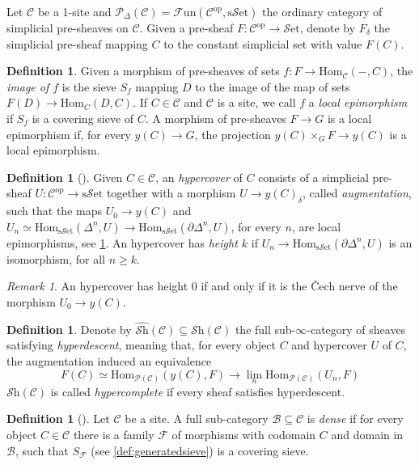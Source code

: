 \documentclass[a4paper]{book}
\newcommand{\lB}{\mathcal{B}}
\newcommand{\lC}{\mathcal{C}}
\newcommand{\lF}{\mathcal{F}}
\newcommand{\lP}{\mathcal{P}}
\newcommand{\lS}{\mathcal{S}}
\newcommand{\op}{\mathrm{op}}
\newcommand{\set}{\lS\mathrm{et}} %
\newcommand{\Fun}{\lF\mathrm{un}} %
\newcommand{\Shv}{\lS\mathrm{h}} %
\newcommand{\sset}{\mathrm{s}\set} %
\renewcommand{\hom}{\mathrm{Hom}} %
\theoremstyle{definition}
\newtheorem{definition}[equation]{Definition}
\theoremstyle{remark}
\newtheorem{remark}[equation]{Remark}
\numberwithin{equation}{section}
\begin{document}
Let $\lC$ be a 1-site and $\lP_\Delta(\lC)=\Fun(\lC^{\op},\sset)$ the ordinary category of simplicial pre-sheaves on $\lC$. Given a pre-sheaf $F:\lC^{\op}\to\set$, denote by $F_\delta$ the simplicial pre-sheaf mapping $C$ to the constant simplicial set with value $F(C)$. 
\begin{definition}\label{def:locepi}
	Given a morphism of pre-sheaves of sets $f:F\to\hom_\lC(-,C)$, the \emph{image of $f$} is the sieve $S_f$  mapping $D$ to the image of the map of sets $F(D)\to\hom_C(D,C)$. If $C\in\lC$ and $\lC$ is a site, we call $f$ a \emph{local epimorphism} if $S_f$ is a covering sieve of $C$. A morphism of pre-sheaves $F\to G$ is a local epimorphism if, for every $y(C)\to G$, the projection $y(C)\times_GF\to y(C)$ is a local epimorphism. 
\end{definition}
\begin{definition}[{\cite[Lemma 4.9]{dugger2003hypercoverssimplicialpresheaves}}]
	Given $C\in\lC$, an \emph{hypercover} of $C$ consists of a simplicial pre-sheaf $U:\lC^{\op}\to\sset$ together with a morphism $U\to y(C)_\delta$, called \emph{augmentation}, such that the maps $U_0\to y(C)$ and $U_n\simeq \hom_{\sset}({\Delta^n},U)\to\hom_{\sset}({\partial\Delta^n},U)$, for every $n$, are local epimorphisms, see \cref{def:locepi}. An hypercover has \emph{height $k$} if $U_n\to\hom_{\sset}(\partial\Delta^n,U)$ is an isomorphism, for all $n\geq k$. 
\end{definition}
\begin{remark}\label{rmk:cech}
	An hypercover has height 0 if and only if it is the \v Cech nerve of the morphism $U_0\to y(C)$. 
\end{remark}
\begin{definition}
	Denote by $\widehat{\Shv}(\lC)\subseteq\Shv(\lC)$ the full sub-$\infty$-category of sheaves satisfying \emph{hyperdescent}, meaning that, for every object $C$ and hypercover $U$ of $C$, the augmentation induced an equivalence 
	$$F(C)\simeq\hom_{\lP(\lC)}(y(C),F)\to\lim_n\hom_{\lP(\lC)}(U_n,F)$$ $\Shv(\lC)$ is called \emph{hypercomplete} if every sheaf satisfies hyperdescent. 
\end{definition}
\begin{definition}[{\cite[Definition 3.12.2]{barwick2020exodromy}}]\label{def:dense}
	Let $\lC$ be a site. A full sub-category $\lB\subseteq\lC$ is \emph{dense} if for every object $C\in\lC$ there is a family $\lF$ of morphisms with codomain $C$ and domain in $\lB$, such that $S_\lF$ (see \cref{def:generatedsieve}) is a covering sieve. 
\end{definition}
\end{document}
